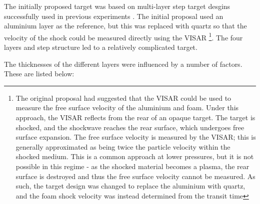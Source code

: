 The initially proposed target was based on multi-layer step target desgins successfully used in previous experiments \cite{Falk2014a, Falk2020}. The initial proposal used an aluminium layer as the reference, but this was replaced with quartz so that the velocity of the shock could be measured directly using the VISAR \footnote{The original proposal had suggested that the VISAR could be used to measure the free surface velocity of the aluminium and foam. Under this approach, the VISAR reflects from the rear of an opaque target. The target is shocked, and the shockwave reaches the rear surface, which undergoes free surface expansion. The free surface velocity is measured by the VISAR; this is generally approximated as being twice the particle velocity within the shocked medium. This is a common approach at lower pressures, but it is not possible in this regime - as the shocked material becomes a plasma, the rear surface is destroyed and thus the free surface velocity cannot be measured. As such, the target design was changed to replace the aluminium with quartz, and the foam shock velocity was instead determined from the transit time}. The four layers and step structure led to a relatively complicated target.

The thicknesses of the different layers were influenced by a number of factors. These are listed below:


